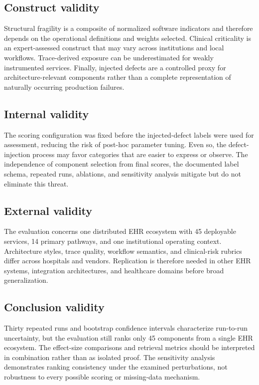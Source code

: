 \documentclass[english,preprint]{elsarticle}
\begin{document}
\subsection{Construct validity}

Structural fragility is a composite of normalized software indicators and therefore depends on the operational definitions and weights selected. Clinical criticality is an expert-assessed construct that may vary across institutions and local workflows. Trace-derived exposure can be underestimated for weakly instrumented services. Finally, injected defects are a controlled proxy for architecture-relevant components rather than a complete representation of naturally occurring production failures.

\subsection{Internal validity}

The scoring configuration was fixed before the injected-defect labels were used for assessment, reducing the risk of post-hoc parameter tuning. Even so, the defect-injection process may favor categories that are easier to express or observe. The independence of component selection from final scores, the documented label schema, repeated runs, ablations, and sensitivity analysis mitigate but do not eliminate this threat.

\subsection{External validity}

The evaluation concerns one distributed EHR ecosystem with 45 deployable services, 14 primary pathways, and one institutional operating context. Architecture styles, trace quality, workflow semantics, and clinical-risk rubrics differ across hospitals and vendors. Replication is therefore needed in other EHR systems, integration architectures, and healthcare domains before broad generalization.

\subsection{Conclusion validity}

Thirty repeated runs and bootstrap confidence intervals characterize run-to-run uncertainty, but the evaluation still ranks only 45 components from a single EHR ecosystem. The effect-size comparisons and retrieval metrics should be interpreted in combination rather than as isolated proof. The sensitivity analysis demonstrates ranking consistency under the examined perturbations, not robustness to every possible scoring or missing-data mechanism.
\end{document}
